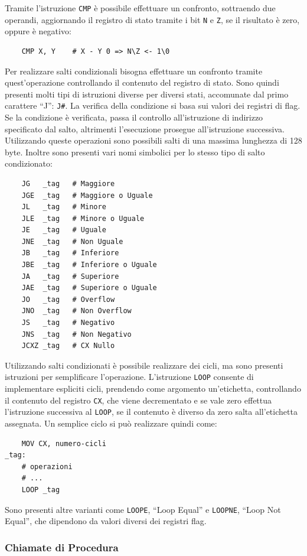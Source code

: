 \documentclass{article}
\numberwithin{equation}{subsection}
\begin{document}
Tramite l'istruzione \verb|CMP| è possibile effettuare un confronto, sottraendo due operandi, aggiornando il registro di stato tramite i bit \verb|N| e \verb|Z|, se il 
risultato è zero, oppure è negativo:
\begin{verbatim}
    CMP X, Y    # X - Y 0 => N\Z <- 1\0
\end{verbatim}
Per realizzare salti condizionali bisogna effettuare un confronto tramite quest'operazione controllando il contenuto del registro di stato. Sono 
quindi presenti molti tipi di istruzioni diverse per diversi stati, accomunate dal primo carattere ``J'': \verb|J#|. La verifica della condizione si basa sui valori dei registri di flag. 
Se la condizione è verificata, passa il controllo all'istruzione di indirizzo specificato dal salto, altrimenti l'esecuzione prosegue all'istruzione successiva. 
Utilizzando queste operazioni sono possibili salti di una massima lunghezza di 128 byte. Inoltre sono presenti vari nomi simbolici per lo stesso tipo di salto condizionato:
\begin{verbatim}
    JG   _tag   # Maggiore 
    JGE  _tag   # Maggiore o Uguale
    JL   _tag   # Minore
    JLE  _tag   # Minore o Uguale
    JE   _tag   # Uguale
    JNE  _tag   # Non Uguale
    JB   _tag   # Inferiore
    JBE  _tag   # Inferiore o Uguale
    JA   _tag   # Superiore
    JAE  _tag   # Superiore o Uguale
    JO   _tag   # Overflow
    JNO  _tag   # Non Overflow
    JS   _tag   # Negativo
    JNS  _tag   # Non Negativo
    JCXZ _tag   # CX Nullo
\end{verbatim}

Utilizzando salti condizionati è possibile realizzare dei cicli, ma sono presenti istruzioni per semplificare l'operazione. L'istruzione \verb|LOOP| 
consente di implementare espliciti cicli, prendendo come argomento un'etichetta, controllando il contenuto del registro \verb|CX|, che viene decrementato e 
se vale zero effettua l'istruzione successiva al \verb|LOOP|, se il contenuto è diverso da zero salta all'etichetta assegnata. Un semplice ciclo si può realizzare quindi come:
\begin{verbatim}
    MOV CX, numero-cicli
_tag:  
    # operazioni 
    # ...
    LOOP _tag
\end{verbatim}
Sono presenti altre varianti come \verb|LOOPE|, ``Loop Equal'' e \verb|LOOPNE|, ``Loop Not Equal'', che dipendono da valori diversi dei registri flag. 

\subsubsection{Chiamate di Procedura}
\end{document}
